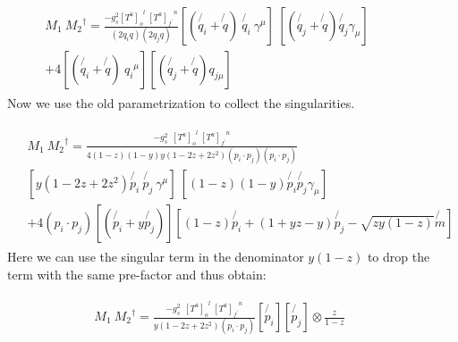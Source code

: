 \begin{align}
\begin{split}
&M_1\: {M_2}^{\dagger} = \frac{-g_s^2 {[T^a]_o}^l \:{[T^a]_{f^{\prime}}}^n }{(2q_i q)(2q_j q)} 
[(\not{q_i} + \not{q})\:\not{q_i}\: \gamma^{\mu}] \:[(\not{q_j} + \not{q}) \not{q_j} \gamma_{\mu}]\:\:\:\:\:\:\:\:\:\:\:\:\:\:\:\:\:\:\:\:\:\: \\
&+4[(\not{q_i} + \not{q})\:{q_{i}}^{\mu}][(\not{q_j} + \not{q}) {q_{j{\mu}}}]
\end{split}
\end{align}
Now we use the old parametrization to collect the singularities.

\begin{align}
\begin{split}
&M_1\: {M_2}^{\dagger} = \frac{-g_s^2 \:\:{[T^a]_o}^l \:{[T^a]_{f^{\prime}}}^n }{4(1-z)(1-y)y(1-2z+2z^2)(p_i \cdot p_j)(p_i \cdot p_j)} \\
&[y(1-2z+2z^2)\not{p_i}\:\not{p_j}\: \gamma^{\mu}] \:[(1-z)(1-y)\not{p_i} \not{p_j} \gamma_{\mu}] \\
&+4(p_i \cdot p_j)[(\not{p_i} + y\not{p_j})][(1-z)\not{p_i} + (1+yz-y) \not{p_j} - \sqrt{zy(1-z)}\not{m}]
\end{split}
\end{align}
Here we can use the singular term in the denominator $ y(1-z) $ to drop the term with the same pre-factor and thus obtain:

\begin{align}
\begin{split}
&M_1\: {M_2}^{\dagger} = \frac{-g_s^2 \:\:{[T^a]_o}^l \:{[T^a]_{f^{\prime}}}^n }{y(1-2z+2z^2)(p_i \cdot p_j)} 
[\not{p_i}][\not{p_j}]\otimes\frac{z}{1-z}\:\:\:\:\:\:\:\:\:\:\:\:\:
\end{split}
\end{align}

\pagebreak


